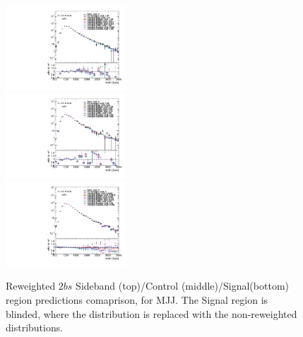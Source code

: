 \begin{figure}[htbp!]
\begin{center}
\includegraphics[width=0.4\textwidth,angle=-90]{figures/boosted/AppendixReweight/Compare/Data_TwoTag_split_Sideband_directcompare_mHH_l_1.pdf}\\
\includegraphics[width=0.4\textwidth,angle=-90]{figures/boosted/AppendixReweight/Compare/Data_TwoTag_split_Control_directcompare_mHH_l_1.pdf}\\
\includegraphics[width=0.4\textwidth,angle=-90]{figures/boosted/AppendixReweight/Compare/Data_TwoTag_split_Signal_directcompare_mHH_l_1.pdf}
\caption{Reweighted $2bs$ Sideband (top)/Control (middle)/Signal(bottom) region predictions comaprison, for MJJ. The Signal region is blinded, where the distribution is replaced with the non-reweighted distributions.}
\label{fig:app-rw-comp-2bs}
\end{center}
\end{figure}

